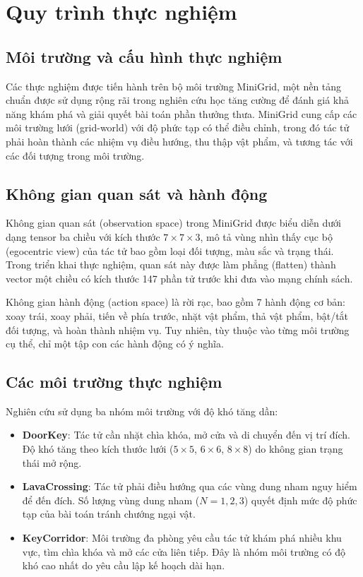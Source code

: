 \documentclass{uetgraduation}
\begin{document}
\section{Quy trình thực nghiệm}

\subsection{Môi trường và cấu hình thực nghiệm}

Các thực nghiệm được tiến hành trên bộ môi trường MiniGrid, một nền tảng chuẩn được sử dụng rộng rãi trong nghiên cứu học tăng cường để đánh giá khả năng khám phá và giải quyết bài toán phần thưởng thưa. MiniGrid cung cấp các môi trường lưới (grid-world) với độ phức tạp có thể điều chỉnh, trong đó tác tử phải hoàn thành các nhiệm vụ điều hướng, thu thập vật phẩm, và tương tác với các đối tượng trong môi trường.

\subsection{Không gian quan sát và hành động}

Không gian quan sát (observation space) trong MiniGrid được biểu diễn dưới dạng tensor ba chiều với kích thước $7 \times 7 \times 3$, mô tả vùng nhìn thấy cục bộ (egocentric view) của tác tử bao gồm loại đối tượng, màu sắc và trạng thái. Trong triển khai thực nghiệm, quan sát này được làm phẳng (flatten) thành vector một chiều có kích thước 147 phần tử trước khi đưa vào mạng chính sách.

Không gian hành động (action space) là rời rạc, bao gồm 7 hành động cơ bản: xoay trái, xoay phải, tiến về phía trước, nhặt vật phẩm, thả vật phẩm, bật/tắt đối tượng, và hoàn thành nhiệm vụ. Tuy nhiên, tùy thuộc vào từng môi trường cụ thể, chỉ một tập con các hành động có ý nghĩa.

\subsection{Các môi trường thực nghiệm}

Nghiên cứu sử dụng ba nhóm môi trường với độ khó tăng dần:

\begin{itemize}
    \item \textbf{DoorKey}: Tác tử cần nhặt chìa khóa, mở cửa và di chuyển đến vị trí đích. Độ khó tăng theo kích thước lưới ($5 \times 5$, $6 \times 6$, $8 \times 8$) do không gian trạng thái mở rộng.
    
    \item \textbf{LavaCrossing}: Tác tử phải điều hướng qua các vùng dung nham nguy hiểm để đến đích. Số lượng vùng dung nham ($N = 1, 2, 3$) quyết định mức độ phức tạp của bài toán tránh chướng ngại vật.
    
    \item \textbf{KeyCorridor}: Môi trường đa phòng yêu cầu tác tử khám phá nhiều khu vực, tìm chìa khóa và mở các cửa liên tiếp. Đây là nhóm môi trường có độ khó cao nhất do yêu cầu lập kế hoạch dài hạn.
\end{itemize}
\end{document}
